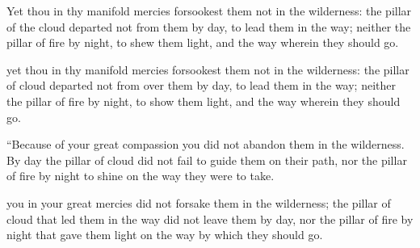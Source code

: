 			Yet thou in thy manifold mercies forsookest them not in the wilderness: the pillar of the cloud departed not from them by day, to lead them in the way; neither the pillar of fire by night, to shew them light, and the way wherein they should go.

			\begin{versebox}
					\item[BHS] 
					\item[LXX] 
					\item[ASV] yet thou in thy manifold mercies forsookest them not in the wilderness: the pillar of cloud departed not from over them by day, to lead them in the way; neither the pillar of fire by night, to show them light, and the way wherein they should go.
					\item[NIV] “Because of your great compassion you did not abandon them in the wilderness. By day the pillar of cloud did not fail to guide them on their path, nor the pillar of fire by night to shine on the way they were to take.
					\item[NRSV] you in your great mercies did not forsake them in the wilderness; the pillar of cloud that led them in the way did not leave them by day, nor the pillar of fire by night that gave them light on the way by which they should go.
			\end{versebox}

